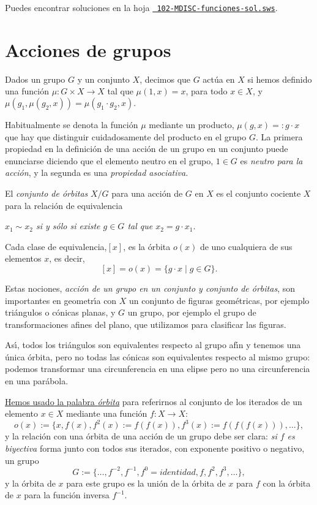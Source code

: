 Puedes encontrar soluciones en la hoja
\href{http://sage.mat.uam.es:8888/home/pub/?/}{\tt
102-MDISC-funciones-sol.sws}.




\section{Acciones de grupos}
Dados un grupo $G$ y un conjunto $X$, decimos que $G$ act\'ua en $X$ si hemos 
definido una funci\'on $\mu:G\times X\to X$ tal que $\mu(1,x)=x$, para todo 
$x\in X$, y $\mu(g_1,\mu(g_2,x))=\mu(g_1\cdot g_2,x).$


Habitualmente se denota la funci\'on $\mu$ mediante un producto, 
$\mu(g,x)=:g\cdot x$ que hay que distinguir cuidadosamente del producto en el 
grupo $G$. La primera propiedad en la definici\'on de una acci\'on de un grupo 
en un conjunto puede enunciarse diciendo que el elemento neutro en el grupo, 
$1\in G$ es {\itshape neutro para la acci\'on}, y la segunda es una {\itshape 
propiedad asociativa.}

El {\itshape conjunto de \'orbitas} $X/G$ para una acci\'on de $G$ en $X$ es el 
conjunto cociente $X$ para la relaci\'on de equivalencia  
\begin{center}
{\itshape $x_1\sim x_2$ si y s\'olo si existe $g\in G$ tal que $x_2=g\cdot 
x_1.$}
\end{center}

Cada clase de equivalencia,$[x]$,  es la \'orbita $o(x)$ de uno cualquiera de 
sus elementos $x$, es decir,
\[[x]=o(x)=\{g\cdot x\mid g\in G\}.\]

Estas nociones, {\itshape acci\'on de un grupo en un conjunto y conjunto de 
\'orbitas}, son importantes en geometr\'{\i}a con $X$ un conjunto de figuras
geom\'etricas, por ejemplo tri\'angulos o c\'onicas planas, y $G$ un grupo, por 
ejemplo el grupo de transformaciones afines del plano, que utilizamos para 
clasificar las figuras.

As\'{\i}, todos los tri\'angulos son equivalentes 
respecto al grupo af\'{\i}n y tenemos una \'unica \'orbita, pero no todas las 
c\'onicas son equivalentes respecto al mismo grupo: podemos transformar una 
circunferencia en una elipse pero no una circunferencia en una par\'abola.  

\hyperref[orbitas]{{\sc Hemos usado} la palabra {\itshape \'orbita}} para referirnos al conjunto de los 
iterados de un elemento $x\in X$ mediante una funci\'on $f:X\to X$:
\[o(x):=\{x,f(x),f^2(x):=f(f(x)),f^3(x):=f(f(f(x))),\dots\},\]
\noindent y la relaci\'on con una \'orbita de una acci\'on de un grupo debe ser 
clara: {\itshape si $f$ es biyectiva} forma junto con todos sus iterados, con 
exponente positivo o negativo, un grupo 
\[G:=\{\dots,f^{-2},f^{-1},f^{0}=identidad,f,f^2,f^3,\dots \},\]
\noindent y la \'orbita de $x$ para este  grupo es la uni\'on de la \'orbita de 
$x$ para $f$ con la \'orbita de $x$ para la funci\'on inversa $f^{-1}$.


